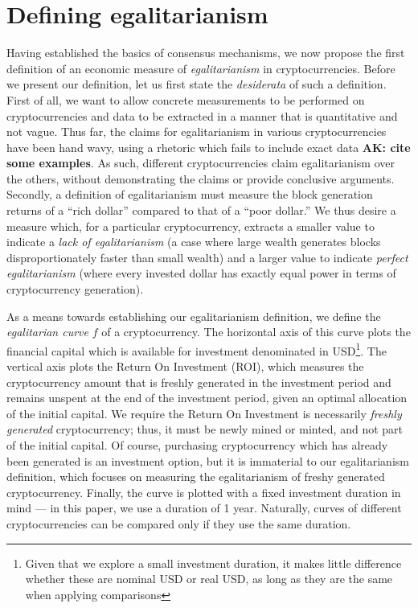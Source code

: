 
\section{Defining egalitarianism}\label{sec:definition}


Having established the basics of consensus mechanisms, we now propose the first
definition of an economic measure of \emph{egalitarianism} in cryptocurrencies.
Before we present our definition, let us first state the \emph{desiderata} of such a
definition. First of all, we want to allow concrete measurements to be
performed on cryptocurrencies and data to be extracted in a manner that is
quantitative and not vague. Thus far, the claims for egalitarianism in various
cryptocurrencies have been hand wavy, using a rhetoric which fails to include
exact data {\bf AK: cite some examples}. As such, different cryptocurrencies claim egalitarianism over the
others, without demonstrating the claims or provide conclusive arguments.
Secondly, a definition of egalitarianism must measure the block generation
returns of a ``rich dollar'' compared to that of a ``poor dollar.''
We thus desire a
measure which, for a particular cryptocurrency, extracts a smaller value
to indicate a \emph{lack of egalitarianism} (\ie a
case where large wealth generates blocks disproportionately faster than
small wealth) and a larger value to indicate \emph{perfect egalitarianism} (where
every invested dollar has exactly equal power in terms of cryptocurrency
generation).

As a means towards establishing our egalitarianism definition, we define the
\emph{egalitarian curve} $f$ of a cryptocurrency. The horizontal axis of this
curve plots the financial capital which is available for investment denominated
in USD\footnote{Given that we explore
a small investment duration, it makes little difference whether these are
nominal USD or real USD, as long as they are the same when applying comparisons}.  The
vertical axis plots the Return On Investment (ROI), which measures the
cryptocurrency amount that is freshly generated in the investment period and
remains unspent at the end of the investment period,
given an optimal allocation of the initial capital. We require
the Return On Investment is necessarily \emph{freshly generated}
cryptocurrency; thus, it must be newly mined or minted, and not part of the
initial capital. Of course, purchasing
cryptocurrency which has already been generated is an investment option, but it
is immaterial to our egalitarianism definition, which focuses on measuring the
egalitarianism of freshy generated cryptocurrency.  Finally, the curve is
plotted with a fixed investment duration in mind --- in this paper, we use a
duration of 1 year.  Naturally, curves of different cryptocurrencies can be
compared only if they use the same duration.

